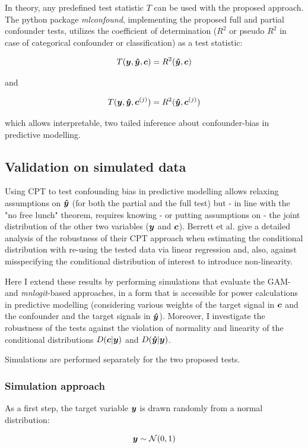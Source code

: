 \documentclass{article}
\begin{document}
In theory, any predefined test statistic $T$ can be used with the proposed approach. The python package \emph{mlconfound}, implementing the proposed full and partial confounder tests, utilizes the coefficient of determination ($R^2$ or pseudo $R^2$ in case of categorical confounder or classification\citep{starkweather2011multinomial}) as a test statistic:

$$T(\boldsymbol{y}, \boldsymbol{\hat{y}}, \boldsymbol{c}) = R^2(\boldsymbol{\hat{y}}, \boldsymbol{c})$$ 

and

$$T(\boldsymbol{y}, \boldsymbol{\hat{y}}, \boldsymbol{c}^{(j)}) = R^2(\boldsymbol{\hat{y}}, \boldsymbol{c}^{(j)})$$ 

which allows interpretable, two tailed inference about confounder-bias in predictive modelling.


\subsection{Validation on simulated data}

Using CPT to test confounding bias in predictive modelling allows relaxing assumptions on $\boldsymbol{\hat{y}}$ (for both the partial and the full test) but - in line with the "no free lunch" theorem, requires knowing - or putting assumptions on - the joint distribution of the other two variables ($\boldsymbol{y}$ and $\boldsymbol{c}$). 
Berrett et al. \cite{berrett2020conditional} give a detailed analysis of the robustness of their CPT approach when estimating the conditional distribution with re-using the tested data via linear regression and, also, against misspecifying the conditional distribution of interest to introduce non-linearity.

Here I extend these results by performing simulations that evaluate the GAM- and \emph{mnlogit}-based approaches, in a form that is accessible for power calculations in predictive modelling (considering various weights of the target signal in $\boldsymbol{c}$ and the confounder and the target signals in $\boldsymbol{\hat{y}}$).
Moreover, I investigate the robustness of the tests against the violation of normality and linearity of the conditional distributions $D(\boldsymbol{c}|\boldsymbol{y})$ and $D(\boldsymbol{\hat{y}}|\boldsymbol{y})$.

Simulations are performed separately for the two proposed tests.

\subsubsection*{Simulation approach}
As  a first step, the target variable $\boldsymbol{y}$ is drawn randomly from a normal distribution:

$$ \boldsymbol{y} \sim \mathcal{N}(0, 1) $$
\end{document}
